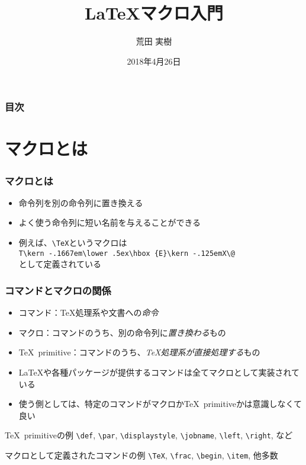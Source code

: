 \documentclass[aspectratio=169]{beamer}
\title{\LaTeX マクロ入門}
\author{荒田 実樹}
\date{2018年4月26日}
\newcommand\cmdname[1]{\texttt{\textbackslash #1}}
\begin{document}
\begin{frame}\frametitle{}
  \titlepage
\end{frame}
\begin{frame}\frametitle{目次}
  \tableofcontents
\end{frame}
\section{マクロとは}
\begin{frame}[fragile] \frametitle{マクロとは}
  \begin{itemize}
  \item 命令列を別の命令列に置き換える
  \item よく使う命令列に短い名前を与えることができる
  \item 例えば、\cmdname{TeX}というマクロは \\
    \lstinline!T\kern -.1667em\lower .5ex\hbox {E}\kern -.125emX\@!\\
    として定義されている
  \end{itemize}
\end{frame}
\begin{frame}[fragile] \frametitle{コマンドとマクロの関係}
  \begin{itemize}
  \item コマンド：\TeX 処理系や文書への\emph{命令}
  \item マクロ：コマンドのうち、別の命令列に\emph{置き換わる}もの
  \item \TeX\ primitive：コマンドのうち、\emph{\TeX 処理系が直接処理する}もの
  \item \LaTeX や各種パッケージが提供するコマンドは全てマクロとして実装されている
  \item 使う側としては、特定のコマンドがマクロか\TeX\ primitiveかは意識しなくて良い
  \end{itemize}
  \begin{exampleblock}{\TeX\ primitiveの例}
    \cmdname{def}, \cmdname{par}, \cmdname{displaystyle}, \cmdname{jobname}, \cmdname{left}, \cmdname{right}, など
  \end{exampleblock}
  \begin{exampleblock}{マクロとして定義されたコマンドの例}
    \cmdname{TeX}, \cmdname{frac}, \cmdname{begin}, \cmdname{item}, 他多数
  \end{exampleblock}
\end{frame}
\end{document}
